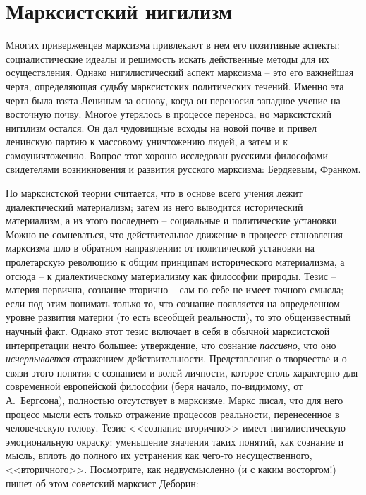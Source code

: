 \documentclass{book}
\begin{document}
\section{Марксистский нигилизм}


Многих приверженцев марксизма привлекают в нем его пози­тивные аспекты: социалистические идеалы и решимость искать действенные 
методы для их осуществления. Однако нигилисти­ческий аспект марксизма -- это его важнейшая черта, определя­ющая судьбу 
марксистских политических течений. Именно эта черта была взята Лениным за основу, когда он переносил западное учение на 
восточную почву. Многое утерялось в процессе переноса, но марксистский нигилизм остался. Он дал чудовищные всходы на новой почве 
и привел ленинскую партию к массовому уничтожению людей, а затем и к самоуничтожению. Вопрос этот хорошо исследован русскими 
философами -- свидетелями воз­никновения и развития русского марксизма: Бердяевым, Фран­ком.

По марксистской теории считается, что в основе всего учения лежит диалектический материализм; затем из него выводится 
исторический материализм, а из этого последнего -- социальные и политические установки. Можно не сомневаться, что действительное 
движение в процессе становления марксизма шло в обратном направлении: от политической установки на пролетарскую революцию к 
общим принципам исторического материа­лизма, а отсюда -- к диалектическому материализму как фило­софии природы. Тезис -- материя 
первична, сознание вторично -- сам по себе не имеет точного смысла; если под этим понимать только то, что сознание появляется на 
определенном уровне развития материи (то есть всеобщей реальности), то это общеизвестный научный факт. Однако этот тезис 
включает в себя в обычной марксистской интерпретации нечто большее: утверждение, что сознание \textit{пассивно},  что оно 
\textit{исчерпывается} отражением действительности. Представление о творчестве и о связи этого понятия с сознанием и волей 
личности, которое столь характерно для современной европейской философии (беря начало, по-видимому, от А.~Бергсона), полностью 
отсутствует в марксизме. Маркс писал, что для него процесс мысли есть только отражение процессов реальности, перенесенное в 
человеческую голову. Тезис <<сознание вторично>> имеет нигилистическую эмоциональную окраску: уменьшение значения таких понятий, 
как сознание и мысль, вплоть до полного их устранения как чего-то несущественного, <<вторичного>>. Посмотрите, как недвусмысленно 
(и с каким восторгом!) пишет об этом советский марксист Деборин:
\end{document}
